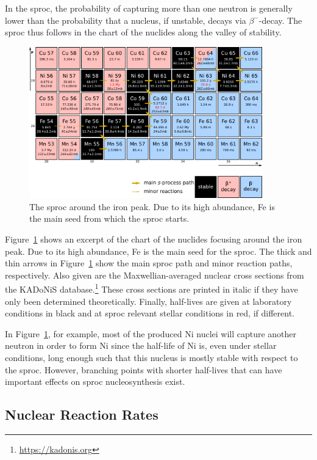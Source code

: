 In the \acf{sproc}, the probability of capturing more than one neutron is generally lower than the probability that a nucleus, if unstable, decays via $\beta^-$-decay. The \ac{sproc} thus follows in the chart of the nuclides along the valley of stability. 
\begin{figure}[tb]
    \centering
    \includegraphics[width=0.9\textwidth]{graphics/s-process/feni_chartnuc}
    \caption{The \ac{sproc} around the iron peak. Due to its high abundance, Fe is the main seed from which the \ac{sproc} starts.}
    \label{fig:s-process:feni_chartnuc}
\end{figure}
Figure~\ref{fig:s-process:feni_chartnuc} shows an excerpt of the chart of the nuclides focusing around the iron peak. Due to its high abundance, Fe is the main seed for the \ac{sproc}. The thick and thin arrows in Figure~\ref{fig:s-process:feni_chartnuc} show the main \ac{sproc} path and minor reaction paths, respectively. Also given are the Maxwellian-averaged nuclear cross sections from the KADoNiS database.\footnote{\url{https://kadonis.org}} These cross sections are printed in italic if they have only been determined theoretically. Finally, half-lives are given at laboratory conditions in black and at \ac{sproc} relevant stellar conditions in red, if different.

In Figure~\ref{fig:s-process:feni_chartnuc}, for example, most of the produced Ni nuclei will capture another neutron in order to form Ni since the half-life of Ni is, even under stellar conditions, long enough such that this nucleus is mostly stable with respect to the \ac{sproc}. However, branching points with shorter half-lives that can have important effects on \ac{sproc} nucleosynthesis exist.


\subsection{Nuclear Reaction Rates}

